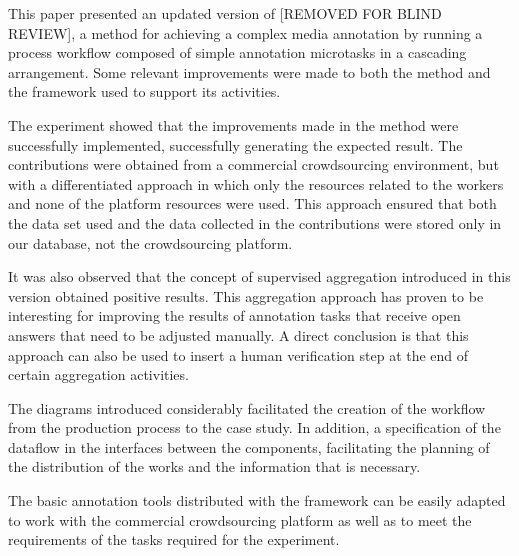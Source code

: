 This paper presented an updated version of [REMOVED FOR BLIND REVIEW], a method for achieving a complex media annotation by running a process workflow composed of simple annotation microtasks in a cascading arrangement. Some relevant improvements were made to both the method and the framework used to support its activities.

The experiment showed that the improvements made in the method were successfully implemented, successfully generating the expected result. The contributions were obtained from a commercial crowdsourcing environment, but with a differentiated approach in which only the resources related to the workers and none of the platform resources were used. This approach ensured that both the data set used and the data collected in the contributions were stored only in our database, not the crowdsourcing platform.

It was also observed that the concept of supervised aggregation introduced in this version obtained positive results. This aggregation approach has proven to be interesting for improving the results of annotation tasks that receive open answers that need to be adjusted manually. A direct conclusion is that this approach can also be used to insert a human verification step at the end of certain aggregation activities.

The diagrams introduced considerably facilitated the creation of the workflow from the production process to the case study. In addition, a specification of the dataflow in the interfaces between the components, facilitating the planning of the distribution of the works and the information that is necessary.

The basic annotation tools distributed with the framework can be easily adapted to work with the commercial crowdsourcing platform as well as to meet the requirements of the tasks required for the experiment.


